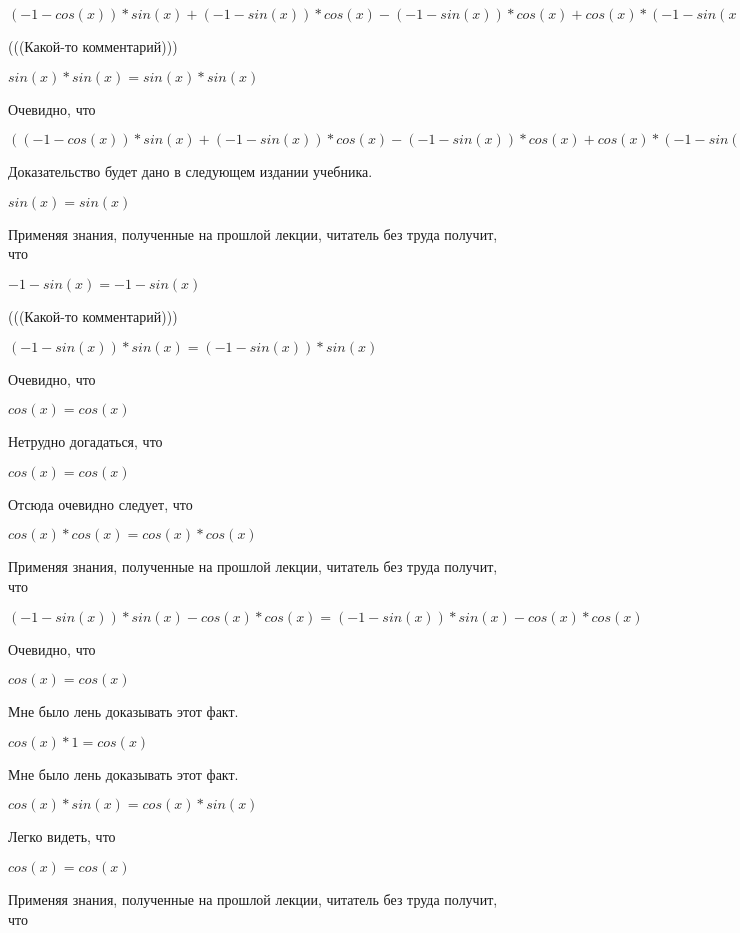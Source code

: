 \documentclass[12pt,a4paper,fleqn]{article}
\theoremstyle{definition}
\begin{document}
$( -1  - cos( x )) * sin( x ) + ( -1  - sin( x )) * cos( x ) - ( -1  - sin( x )) * cos( x ) + cos( x ) * ( -1  - sin( x )) = ( -1  - cos( x )) * sin( x ) + ( -1  - sin( x )) * cos( x ) - ( -1  - sin( x )) * cos( x ) + cos( x ) * ( -1  - sin( x ))$

(((Какой-то комментарий))) 

$sin( x ) * sin( x ) = sin( x ) * sin( x )$

Очевидно, что 

$(( -1  - cos( x )) * sin( x ) + ( -1  - sin( x )) * cos( x ) - ( -1  - sin( x )) * cos( x ) + cos( x ) * ( -1  - sin( x ))) * sin( x ) * sin( x ) = (( -1  - cos( x )) * sin( x ) + ( -1  - sin( x )) * cos( x ) - ( -1  - sin( x )) * cos( x ) + cos( x ) * ( -1  - sin( x ))) * sin( x ) * sin( x )$

Доказательство будет дано в следующем издании учебника. 

$sin( x ) = sin( x )$

Применяя знания, полученные на прошлой лекции, читатель без труда получит, что 

$ -1  - sin( x ) =  -1  - sin( x )$

(((Какой-то комментарий))) 

$( -1  - sin( x )) * sin( x ) = ( -1  - sin( x )) * sin( x )$

Очевидно, что 

$cos( x ) = cos( x )$

Нетрудно догадаться, что 

$cos( x ) = cos( x )$

Отсюда очевидно следует, что 

$cos( x ) * cos( x ) = cos( x ) * cos( x )$

Применяя знания, полученные на прошлой лекции, читатель без труда получит, что 

$( -1  - sin( x )) * sin( x ) - cos( x ) * cos( x ) = ( -1  - sin( x )) * sin( x ) - cos( x ) * cos( x )$

Очевидно, что 

$cos( x ) = cos( x )$

Мне было лень доказывать этот факт.

$cos( x ) *  1  = cos( x )$

Мне было лень доказывать этот факт.

$cos( x ) * sin( x ) = cos( x ) * sin( x )$

Легко видеть, что 

$cos( x ) = cos( x )$

Применяя знания, полученные на прошлой лекции, читатель без труда получит, что 
\end{document}
